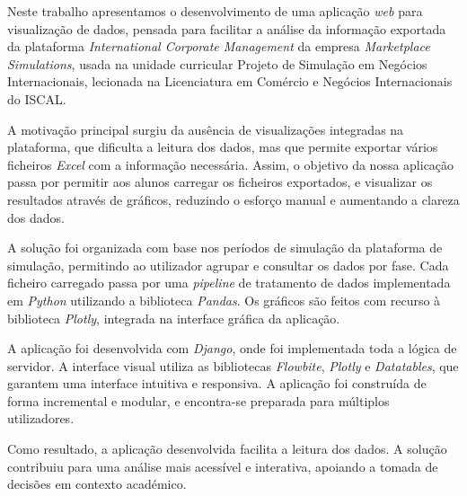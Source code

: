 




Neste trabalho apresentamos o desenvolvimento de uma aplicação \textit{web} para visualização de dados, pensada para facilitar a análise da informação exportada da plataforma \textit{International Corporate Management} da empresa \textit{Marketplace Simulations}, usada na unidade curricular Projeto de Simulação em Negócios Internacionais, lecionada na Licenciatura em Comércio e Negócios Internacionais do ISCAL.

A motivação principal surgiu da ausência de visualizações integradas na plataforma, que dificulta a leitura dos dados, mas que permite exportar vários ficheiros \textit{Excel} com a informação necessária. Assim, o objetivo da nossa aplicação passa por permitir aos alunos carregar os ficheiros exportados, e visualizar os resultados através de gráficos, reduzindo o esforço manual e aumentando a clareza dos dados.

A solução foi organizada com base nos períodos de simulação da plataforma de simulação, permitindo ao utilizador agrupar e consultar os dados por fase. Cada ficheiro carregado passa por uma \textit{pipeline} de tratamento de dados implementada em \textit{Python} utilizando a biblioteca \textit{Pandas}. Os gráficos são feitos com recurso à biblioteca \textit{Plotly}, integrada na interface gráfica da aplicação.

A aplicação foi desenvolvida com \textit{Django}, onde foi implementada toda a lógica de servidor. A interface visual utiliza as bibliotecas \textit{Flowbite}, \textit{Plotly} e \textit{Datatables}, que garantem uma interface intuitiva e responsiva. A aplicação foi construída de forma incremental e modular, e encontra-se preparada para múltiplos utilizadores.

Como resultado, a aplicação desenvolvida facilita a leitura dos dados. A solução contribuiu para uma análise mais acessível e interativa, apoiando a tomada de decisões em contexto académico.

